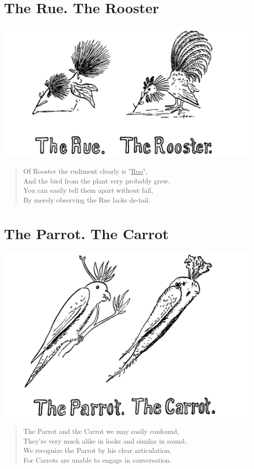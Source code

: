 \documentclass[letterpaper, 10pt, openany]{memoir}
\begin{document}
\chapter{The Rue. The Rooster}
\includegraphics[width=1\textwidth]{f-p04.png}
\vspace{\onelineskip}
\begin{verse}\huge
Of Rooster the rudiment clearly is "\underline{Roo}",\\
And the bird from the plant very probably grew.\\
You can easily tell them apart without fail,\\
By merely observing the Rue lacks de-tail.\\
\end{verse}
\vspace{\onelineskip}

\chapter{The Parrot. The Carrot}
\includegraphics[width=1\textwidth]{f-p05.png}
\vspace{\onelineskip}
\begin{verse}\huge
The Parrot and the Carrot we may easily confound,\\
They're very much alike in looks and similar in sound,\\
We recognize the Parrot by his clear articulation,\\
For Carrots are unable to engage in conversation.\\
\end{verse}
\vspace{\onelineskip}
\end{document}
